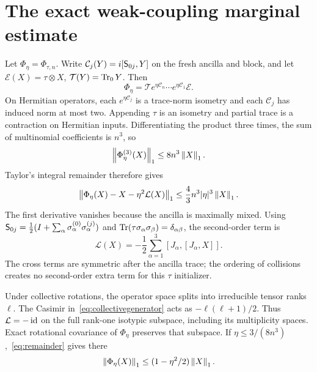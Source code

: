 \section{The exact weak-coupling marginal estimate}\label{app:collective}

Let $\Phi_\eta=\Phi_{\tau,n}$. Write $\mathcal C_j(Y)=i[\mathsf S_{0j},Y]$ on the fresh ancilla and block, and let $\mathcal E(X)=\tau\otimes X$, $\mathcal T(Y)=\operatorname{Tr}_0Y$. Then
\begin{equation}
 \Phi_\eta=\mathcal T e^{\eta\mathcal C_n}\cdots e^{\eta\mathcal C_1}\mathcal E.
\end{equation}
On Hermitian operators, each $e^{\eta\mathcal C_j}$ is a trace-norm isometry and each $\mathcal C_j$ has induced norm at most two. Appending $\tau$ is an isometry and partial trace is a contraction on Hermitian inputs. Differentiating the product three times, the sum of multinomial coefficients is $n^3$, so
\begin{equation}
 \left\lVert\Phi_\eta^{(3)}(X)\right\rVert_1\le8n^3\left\lVert X\right\rVert_1.
\end{equation}
Taylor's integral remainder therefore gives
\begin{equation}
 \left\lVert\Phi_\eta(X)-X-\eta^2\mathcal L(X)\right\rVert_1
 \le\frac43n^3|\eta|^3\left\lVert X\right\rVert_1.
 \label{eq:remainder}
\end{equation}
The first derivative vanishes because the ancilla is maximally mixed. Using $\mathsf S_{0j}=\tfrac12(I+\sum_\alpha\sigma_\alpha^{(0)}\sigma_\alpha^{(j)})$ and $\operatorname{Tr}(\tau\sigma_\alpha\sigma_\beta)=\delta_{\alpha\beta}$, the second-order term is
\begin{equation}
 \mathcal L(X)=-\frac12\sum_{\alpha=1}^3[J_\alpha,[J_\alpha,X]].
 \label{eq:collectivegenerator}
\end{equation}
The cross terms are symmetric after the ancilla trace; the ordering of collisions creates no second-order extra term for this $\tau$ initializer.

Under collective rotations, the operator space splits into irreducible tensor ranks $\ell$. The Casimir in~\eqref{eq:collectivegenerator} acts as $-\ell(\ell+1)/2$. Thus $\mathcal L=-\operatorname{id}$ on the full rank-one isotypic subspace, including its multiplicity spaces. Exact rotational covariance of $\Phi_\eta$ preserves that subspace. If $\eta\le3/(8n^3)$,~\eqref{eq:remainder} gives there
\begin{equation}
 \left\lVert\Phi_\eta(X)\right\rVert_1\le(1-\eta^2/2)\left\lVert X\right\rVert_1.
 \label{eq:rankonecontract}
\end{equation}


